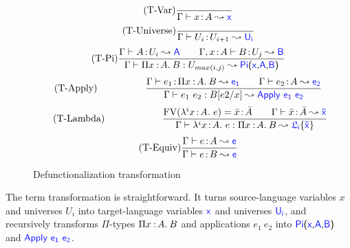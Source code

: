 \begin{figure}[H]
	\begin{equation}
		\tag{T-Var}
		\frac
			{}
			{\Gamma \vdash x \goodcolon A \leadsto \target{x}}
	\end{equation} \hspace{0.5cm}
	\begin{equation}
		\tag{T-Universe}
		\frac
			{}
			{\Gamma \vdash U_i \goodcolon U_{i+1} \leadsto \target{U_i}}
	\end{equation} \hspace{0.5cm}
	\begin{equation}
		\tag{T-Pi}
		\frac
			{\Gamma \vdash A \goodcolon U_i \leadsto \target{A} \qquad \Gamma, x \goodcolon A \vdash B \goodcolon U_j \leadsto \target{B}
			}
			{\Gamma \vdash \pitype{x}{A}{B} \mathrel{:} U_{max(i, j)} \leadsto \targetpi{x}{A}{B}}
	\end{equation} \hspace{0.5cm}
	\begin{equation}
		\tag{T-Apply}
		\qquad\qquad\quad
		\frac
			{\Gamma \vdash e_1 \goodcolon \pitype{x}{A}{B} \leadsto \target{e_1} \qquad \Gamma \vdash e_2 \goodcolon A \leadsto \target{e_2}}
			{\Gamma \vdash e_1 \ e_2 \mathrel{:} B\sub{e2}{x} \leadsto \targetapp{e_1}{e_2}}
	\end{equation} \hspace{0.5cm}
	\begin{equation}
		\tag{T-Lambda}
		\qquad\qquad\qquad
		\frac
			{ \text{FV}(\lami{i}{x}{A}{e}) = \bar{x} \goodcolon \bar{A} \qquad \Gamma \vdash \bar{x} \goodcolon \bar{A} \leadsto \target{\bar{x}} }
			{ \Gamma \vdash \lami{i}{x}{A}{e} \mathrel{:} \pitype{x}{A}{B} \leadsto \target{\flabel_i}\{\target{\bar{x}}\}}
	\end{equation} \hspace{0.5cm}
	\begin{equation}
		\tag{T-Equiv}
		\frac
			{\Gamma \vdash e \goodcolon A \leadsto \target{e}}
			{\Gamma \vdash e \goodcolon B \leadsto \target{e}}
	\end{equation}
	\caption{Defunctionalization transformation}
    \label{fig:dcc transformation}
\end{figure}

The term transformation is straightforward. It turns source-language variables $x$ and universes $U_i$ into target-language variables $\target{x}$ and universes $\target{U_i}$, and recursively transforms $\Pi$-types $\Pi x\mkern1.5mu{\hspace{0.5mm}{:}\hspace{0.5mm}} A.\hspace{0.8mm}B$ and applications $e_1\ e_2$ into $\targetpi{x}{A}{B}$ and $\targetapp{e_1}{e_2}$.

